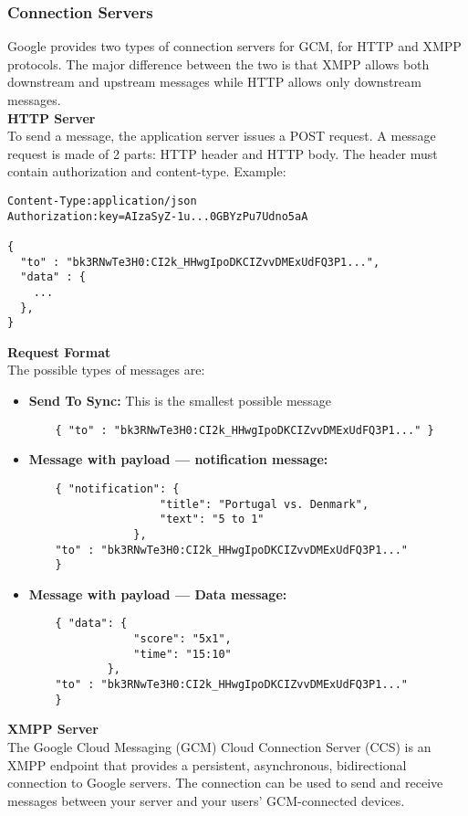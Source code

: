 \subsubsection{Connection Servers}
Google provides two types of connection servers for GCM, for HTTP and XMPP protocols. The major difference between the two is that XMPP allows both downstream and upstream messages while HTTP allows only downstream messages.\\
\textbf{HTTP Server}\\
To send a message, the application server issues a POST request. A message request is made of 2 parts: HTTP header and HTTP body. The header must contain authorization and content-type. Example:\\
\begin{lstlisting}
Content-Type:application/json
Authorization:key=AIzaSyZ-1u...0GBYzPu7Udno5aA

{
  "to" : "bk3RNwTe3H0:CI2k_HHwgIpoDKCIZvvDMExUdFQ3P1...",
  "data" : {
    ...
  },
}
\end{lstlisting}
\small\textbf{Request Format}\\
The possible types of messages are:
\begin{itemize}
	\item \small\textbf{Send To Sync: } This is the smallest possible message
		\begin{lstlisting}
	{ "to" : "bk3RNwTe3H0:CI2k_HHwgIpoDKCIZvvDMExUdFQ3P1..." }
		\end{lstlisting}
	\item \small\textbf{Message with payload — notification message: }
	\begin{lstlisting}
	{ "notification": {
    				"title": "Portugal vs. Denmark",
    				"text": "5 to 1"
  				},
  	"to" : "bk3RNwTe3H0:CI2k_HHwgIpoDKCIZvvDMExUdFQ3P1..."
	}
		\end{lstlisting} 
	\item \small\textbf{Message with payload — Data message: }
	\begin{lstlisting}
	{ "data": {
    			"score": "5x1",
    			"time": "15:10"
  			},
  	"to" : "bk3RNwTe3H0:CI2k_HHwgIpoDKCIZvvDMExUdFQ3P1..."
	}
		\end{lstlisting} 
\end{itemize}
\textbf{XMPP Server}\\
The Google Cloud Messaging (GCM) Cloud Connection Server (CCS) is an XMPP endpoint that provides a persistent, asynchronous, bidirectional connection to Google servers. The connection can be used to send and receive messages between your server and your users' GCM-connected devices.
